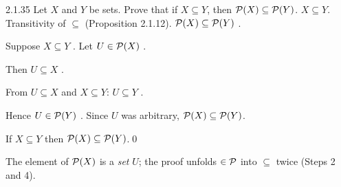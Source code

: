 \begin{bookex}[essential]{2.1.35}
Let $X$ and $Y$ be sets. Prove that if $X\subseteq Y$, then $\mathcal{P}(X)\subseteq\mathcal{P}(Y)$.
\solution
\given $X\subseteq Y$. Transitivity of $\subseteq$ (Proposition 2.1.12).
\goal $\mathcal{P}(X)\subseteq\mathcal{P}(Y)$ .
\begin{steps}
\item Suppose $X\subseteq Y$ . Let $U\in\mathcal{P}(X)$ .
\item Then $U\subseteq X$ .
\item From $U\subseteq X$ and $X\subseteq Y$: $U\subseteq Y$ .
\item Hence $U\in\mathcal{P}(Y)$ . Since $U$ was arbitrary, $\mathcal{P}(X)\subseteq\mathcal{P}(Y)$.
\end{steps}
\conclusion If $X\subseteq Y$ then $\mathcal{P}(X)\subseteq\mathcal{P}(Y)$.\qed
\begin{compare}
\item The element of $\mathcal{P}(X)$ is a \emph{set} $U$; the proof unfolds $\in\mathcal{P}$ into $\subseteq$ twice (Steps 2 and 4).
\end{compare}
\end{bookex}

